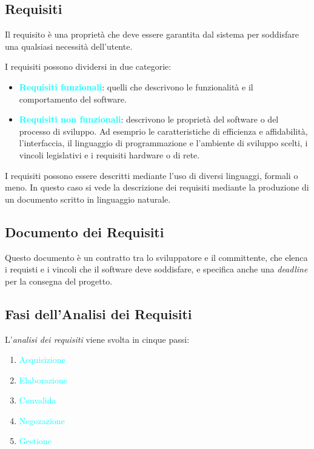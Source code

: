 \subsection{Requisiti}

\begin{definition}[Requisito]
    Il requisito è una proprietà che deve essere garantita dal sistema per soddisfare
    una qualsiasi necessità dell'utente.
\end{definition}

I requisiti possono dividersi in due categorie:
\begin{itemize}
    \item \textbf{\textcolor{cyan}{Requisiti funzionali}}: quelli che descrivono le funzionalità e il comportamento del software.
    \item \textbf{\textcolor{cyan}{Requisiti non funzionali}}: descrivono le proprietà del software o del processo di sviluppo. Ad esemprio le caratteristiche di
        efficienza e affidabilità, l'interfaccia, il linguaggio di programmazione e l'ambiente di sviluppo scelti, i vincoli legislativi e i requisiti hardware o di rete.
\end{itemize}

I requisiti possono essere descritti mediante l'uso di diversi linguaggi, formali o meno. In questo caso si vede
la descrizione dei requisiti mediante la produzione di un documento scritto in linguaggio naturale.

\subsection{Documento dei Requisiti}

Questo documento è un contratto tra lo sviluppatore e il committente, che elenca i requisti e i vincoli che il software deve soddisfare, e specifica
anche una \emph{deadline} per la consegna del progetto.

\subsection{Fasi dell'Analisi dei Requisiti}

L'\emph{analisi dei requisiti} viene svolta in cinque passi:
\begin{enumerate}
    \item \textcolor{cyan}{Acquisizione}
    \item \textcolor{cyan}{Elaborazione}
    \item \textcolor{cyan}{Convalida}
    \item \textcolor{cyan}{Negozazione}
    \item \textcolor{cyan}{Gestione}
\end{enumerate}

